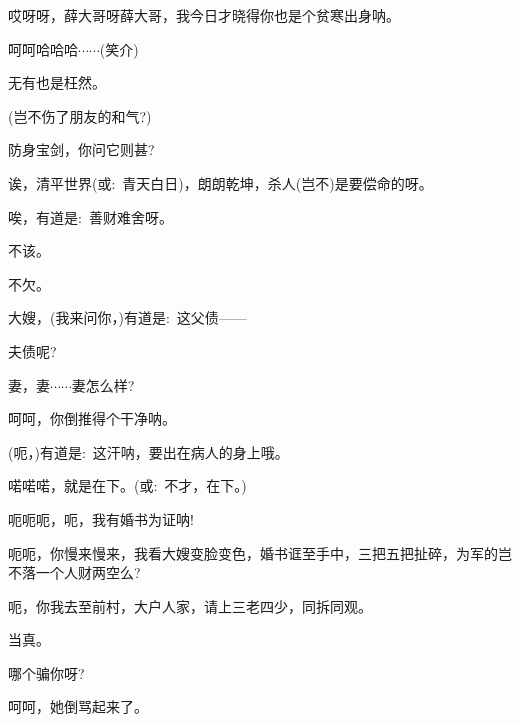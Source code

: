 {{{{哎呀呀，薛大哥呀薛大哥，我今日才晓得你也是个贫寒出身呐。}

{呵呵哈哈哈$\cdots{}\cdots{}$({\hwfs 笑}{\hwfs 介})}


{无有也是枉然。}

{(岂不伤了朋友的和气?)}

{防身宝剑，你问它则甚?}

{诶，清平世界({\akai 或}:~青天白日)，朗朗乾坤，杀人(岂不)是要偿命的呀。}

{唉，有道是:~善财难舍呀。}


{不该。}

{不欠。}

{大嫂，(我来问你，)有道是:~这父债------}

{夫债呢?}

{妻，妻$\cdots{}\cdots{}$妻怎么样?}

{呵呵，你倒推得个干净呐。}

{(呃，)有道是:~这汗呐，要出在病人的身上哦。}


{喏喏喏，就是在下。({\akai 或}:~不才，在下。)}

{呃呃呃，呃，我有婚书为证呐!}

呃呃，你慢来慢来，我看大嫂变脸变色，婚书诓至手中，三把五把扯碎，为军的岂不落一个人财两空么?

呃，你我去至前村，大户人家，请上三老四少，同拆同观。

当真。

哪个骗你呀?

{呵呵，她倒骂起来了。}

{ }





}}}
